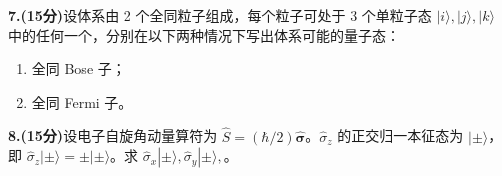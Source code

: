 \textbf{7.(15分)}设体系由 2 个全同粒子组成，每个粒子可处于 3 个单粒子态 $|i\rangle, |j\rangle, |k\rangle$ 中的任何一个，分别在以下两种情况下写出体系可能的量子态：
\begin{enumerate}
    \item 全同 Bose 子；
    \item 全同 Fermi 子。
\end{enumerate}

\textbf{8.(15分)}设电子自旋角动量算符为 $\hat{S} = (\hbar/2) \hat{\mathbf{\sigma}}$。$\hat{\sigma}_z$ 的正交归一本征态为 $|\pm\rangle$，即 $\hat{\sigma}_z|\pm\rangle = \pm|\pm\rangle$。求 $\hat{\sigma}_x|\pm\rangle, \hat{\sigma}_y|\pm\rangle, $。